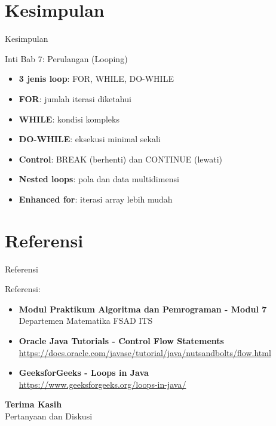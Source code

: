 \documentclass{beamer}
\begin{document}
\section{Kesimpulan}
\begin{frame}{Kesimpulan}
  \begin{alertblock}{Inti Bab 7: Perulangan (Looping)}
    \begin{itemize}
      \item \textbf{3 jenis loop}: FOR, WHILE, DO-WHILE
      \item \textbf{FOR}: jumlah iterasi diketahui
      \item \textbf{WHILE}: kondisi kompleks
      \item \textbf{DO-WHILE}: eksekusi minimal sekali
      \item \textbf{Control}: BREAK (berhenti) dan CONTINUE (lewati)
      \item \textbf{Nested loops}: pola dan data multidimensi
      \item \textbf{Enhanced for}: iterasi array lebih mudah
    \end{itemize}
  \end{alertblock}
\end{frame}

\section{Referensi}
\begin{frame}{Referensi}
  \begin{block}{Referensi:}
    \begin{itemize}
      \item \textbf{Modul Praktikum Algoritma dan Pemrograman - Modul 7}\\
            Departemen Matematika FSAD ITS
      \item \textbf{Oracle Java Tutorials - Control Flow Statements}\\
            \url{https://docs.oracle.com/javase/tutorial/java/nutsandbolts/flow.html}
      \item \textbf{GeeksforGeeks - Loops in Java}\\
            \url{https://www.geeksforgeeks.org/loops-in-java/}
    \end{itemize}
  \end{block}
\end{frame}

\begin{frame}[standout]
  \Huge \textbf{Terima Kasih} \\[1.5em]
  \Large Pertanyaan dan Diskusi
\end{frame}
\end{document}
